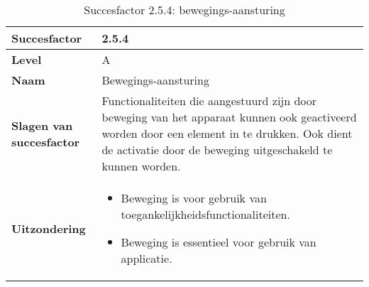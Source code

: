 \begin{table}[H]
    \centering
    \caption{Succesfactor 2.5.4: bewegings-aansturing}
    
    
    \hspace*{-1cm}\begin{tabular}{|l|p{12cm}|} 
        \hline
        \textbf{Succesfactor}                 & 2.5.4                                                                                                                                                                                                                                                                                                                                                                                                                                                                                                        \\ 
        \hline
        \textbf{Level}                        & A                                                                                                                                                                                                                                                                                                                                                                                                                                                                                                               \\ 
        \hline
        \textbf{Naam}                         & Bewegings-aansturing~                                                                                                                                                                                                                                                                                                                                                                                                                                                                                      \\ 
        \hline
        \textbf{Slagen van succesfactor}      & Functionaliteiten die aangestuurd zijn door beweging van het apparaat kunnen ook geactiveerd worden door een element in te drukken. Ook dient de activatie door de beweging uitgeschakeld te kunnen worden.
        \\ 
                \hline
        \textbf{Uitzondering}     & 
        \begin{itemize}
            \item Beweging is voor gebruik van toegankelijkheidsfunctionaliteiten.
            \item Beweging is essentieel voor gebruik van applicatie.
        \end{itemize}                                                                                                                                                                                           \\ 


\end{tabular}
\end{table}
